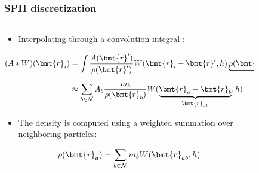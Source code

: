 \begin{frame}
	\frametitle{SPH discretization}

    \begin{columns}[T] %
        \begin{column}{.6\textwidth}
            \begin{itemize}
                \item Interpolating through a convolution integral \cite{Price2012}:
            \end{itemize}
            \begin{align}
                    (A * W)(\bmt{r}_i) &=
                    \int \frac{A(\bmt{r}')}{\rho (\bmt{r}')} W(\bmt{r}_i-\bmt{r}', h) \underbrace{\rho (\bmt{r}')\mathrm{d}\bmt{r}'}_{\mathrm{d}m'}\\
                    &\approx \sum_{b \in \mathcal{N}} A_b \frac{m_b}{\rho (\bmt{r}_b)} W(\underbrace{\bmt{r}_a-\bmt{r}_b}_{\bmt{r}_{ab}}, h)
            \end{align}
            \begin{itemize}
                \item The density is computed using a weighted summation over neighboring particles:
            \end{itemize}
            \begin{align}
                    \rho(\bmt{r}_a) =  \sum_{b \in \mathcal{N}} m_b W(\bmt{r}_{ab}, h)
            \end{align}
        \end{column}
        \hfill
        \begin{column}{.3\textwidth}
            \begin{figure}[h]
                \centering
                \def\svgwidth{\textwidth}
                
                \label{fig: integral to sum}
            \end{figure}
            \begin{figure}[b!]
                \centering
                \def\svgwidth{0.7\textwidth}
                
                \label{fig: density calculation}
            \end{figure}
        \end{column}
    \end{columns}

\end{frame}
